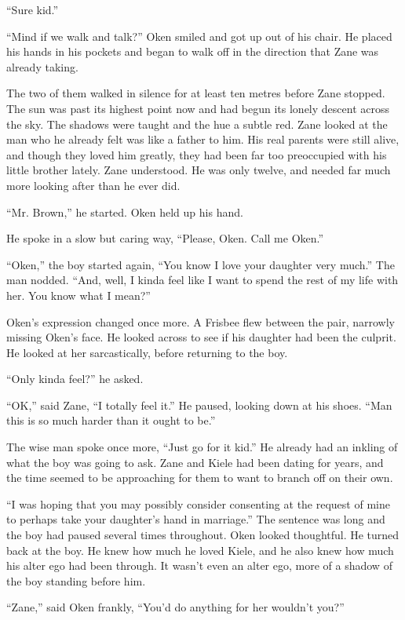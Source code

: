 ``Sure kid.''

``Mind if we walk and talk?''  Oken smiled and got up out of his chair.  He placed his hands in his pockets and began to walk off in the direction that Zane was already taking.  

The two of them walked in silence for at least ten metres before Zane stopped.  The sun was past its highest point now and had begun its lonely descent across the sky.  The shadows were taught and the hue a subtle red.  Zane looked at the man who he already felt was like a father to him.  His real parents were still alive, and though they loved him greatly, they had been far too preoccupied with his little brother lately.  Zane understood.  He was only twelve, and needed far much more looking after than he ever did.

``Mr. Brown,'' he started.  Oken held up his hand.

He spoke in a slow but caring way, ``Please, Oken.  Call me Oken.''

``Oken,'' the boy started again, ``You know I love your daughter very much.''  The man nodded.  ``And, well, I kinda feel like I want to spend the rest of my life with her.  You know what I mean?''

Oken's expression changed once more.  A Frisbee flew between the pair, narrowly missing Oken's face.  He looked across to see if his daughter had been the culprit.  He looked at her sarcastically, before returning to the boy.  

``Only kinda feel?'' he asked.

``OK,'' said Zane, ``I totally feel it.''  He paused, looking down at his shoes.  ``Man this is so much harder than it ought to be.''

The wise man spoke once more, ``Just go for it kid.''  He already had an inkling of what the boy was going to ask.  Zane and Kiele had been dating for years, and the time seemed to be approaching for them to want to branch off on their own.

``I was hoping that you may possibly consider consenting at the request of mine to perhaps take your daughter's hand in marriage.''  The sentence was long and the boy had paused several times throughout.  Oken looked thoughtful.  He turned back at the boy.  He knew how much he loved Kiele, and he also knew how much his alter ego had been through.  It wasn't even an alter ego, more of a shadow of the boy standing before him.  

``Zane,'' said Oken frankly, ``You'd do anything for her wouldn't you?''

